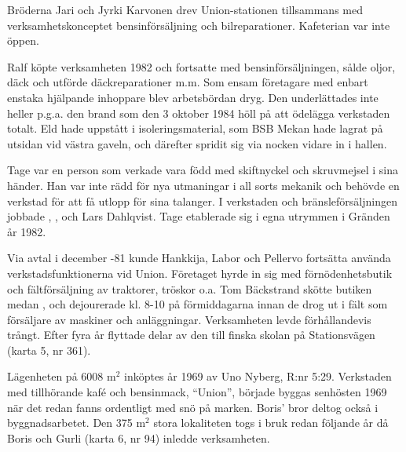 %
Bröderna Jari och Jyrki Karvonen drev Union-stationen tillsammans med verksamhetskonceptet bensinförsäljning och bilreparationer. Kafeterian var inte öppen.\jhvspace{}


%
Ralf köpte verksamheten 1982 och fortsatte med bensinförsäljningen, sålde oljor, däck och utförde däckreparationer m.m. Som ensam företagare med enbart enstaka hjälpande inhoppare blev arbetsbördan dryg.	Den underlättades inte heller p.g.a. den brand som den 3 oktober 1984 höll på att ödelägga verkstaden totalt. Eld hade uppstått i isoleringsmaterial, som BSB Mekan hade lagrat på utsidan vid västra	gaveln, och därefter spridit sig via nocken vidare in i hallen.


%
Tage var en person som verkade vara född med skiftnyckel och skruvmejsel i sina händer. Han var inte rädd för nya utmaningar i all sorts mekanik och behövde en verkstad för att få utlopp för sina talanger. I verkstaden och bränsleförsäljningen jobbade , ,  och Lars Dahlqvist. Tage etablerade sig i egna 	utrymmen i Gränden år 1982.


%
Via avtal i december -81 kunde Hankkija, Labor och Pellervo fortsätta använda verkstadsfunktionerna vid Union. Företaget hyrde in sig med förnödenhetsbutik och fältförsäljning av traktorer, tröskor o.a. Tom Bäckstrand skötte butiken medan ,  och  dejourerade kl. 8-10 på förmiddagarna innan de drog ut i fält som försäljare av maskiner och anläggningar. Verksamheten levde förhållandevis trångt. Efter fyra år flyttade delar av den till finska skolan på Stationsvägen (karta 5,  nr 361).




%
Lägenheten på 6008 m$^2$ inköptes år 1969 av Uno Nyberg, R:nr 5:29. Verkstaden med tillhörande kafé och bensinmack, ``Union'', började	byggas senhösten 1969 när det redan fanns ordentligt med snö på marken. Boris' bror  deltog också i byggnadsarbetet. Den 375 m$^2$ stora lokaliteten togs i bruk redan följande år då Boris och Gurli (karta 6, nr 94) inledde verksamheten.

